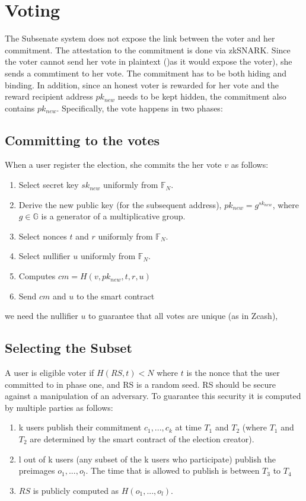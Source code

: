 \documentclass[]{article}
\begin{document}
	
		
\section{Voting}
The Subsenate system does not expose  the link between the voter and her commitment. The attestation to the commitment is done via zkSNARK.  
Since the voter cannot send her vote in plaintext ()as it would expose the voter), she sends a commtiment to her vote. The commitment has to be both hiding and binding. In addition, since an honest voter is rewarded for her vote and the reward recipient address $pk_{new}$ needs to be kept hidden, the commitment also contains $pk_{new}$.
Specifically, the vote happens in two phases:
\subsection{Committing to the votes}
When a user register the election, she commits the her vote $v$ as follows:

\begin{enumerate}
	\item Select secret key $sk_{new}$ uniformly from $\mathbb{F}_N$.
	\item Derive the new public key (for the subsequent address),  $pk_{new} = g^{sk_{new}}$, where $g\in \mathbb{G}$ is a generator of a multiplicative group.
	\item Select nonces $t$ and $r$ uniformly from $\mathbb{F}_N$.
	\item Select nullifier $u$ uniformly from $\mathbb{F}_N$.
	\item Computes $cm = H(v,pk_{new},t,r,u)$
	\item Send $cm$ and $u$ to the smart contract
\end{enumerate}

we need the nullifier $u$ to guarantee that all votes are unique (as in Zcash), 
\subsection{Selecting the Subset}
A user is eligible voter if $H(RS,t)<N$ where $t$ is the nonce that the user committed to in phase one, and RS is a random seed. RS should be secure against a manipulation of an adversary.  To guarantee this security it is computed by multiple parties as follows:
\begin{enumerate}
	\item k users publish their commitment $c_1,...,c_k$ at  time  $T_1$ and $T_2$ (where $T_1$ and $T_2$ are determined by the smart contract of the election creator).
	\item l out of k users (any subset of the k users who participate) publish the preimages  $o_1,...,o_l$. The time that is allowed to publish is between $T_3$ to $T_4$ 
	\item $RS$ is publicly computed as $H(o_1,...,o_l)$.
\end{enumerate}
\end{document}
